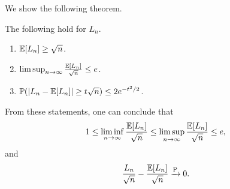 We show the following theorem.
\begin{theorem}
    The following hold for $L_{n}$.
    \begin{enumerate}
        \item $\mathbb{E}[L_{n}] \geq \sqrt{n}$.
        \item $\limsup_{n \to \infty} \frac{\mathbb{E}[L_{n}]}{\sqrt{n}} \leq e$.
        \item $\mathbb{P}(\left| L_{n}-\mathbb{E}[L_{n}] \right| \geq t\sqrt{n}) \leq 2e^{-t^{2}/2}$.
    \end{enumerate}
\end{theorem}
\noindent From these statements, one can conclude that
\begin{align}
    1 \leq \liminf_{n \to \infty} \frac{\mathbb{E}[L_{n}]}{\sqrt{n}} \leq \limsup_{n \to \infty} \frac{\mathbb{E}[L_{n}]}{\sqrt{n}} \leq e,
\end{align}
and
\begin{align}
    \frac{L_{n}}{\sqrt{n}} - \frac{\mathbb{E}[L_{n}]}{\sqrt{n}} \xrightarrow{\operatorname{P}} 0.
\end{align}

